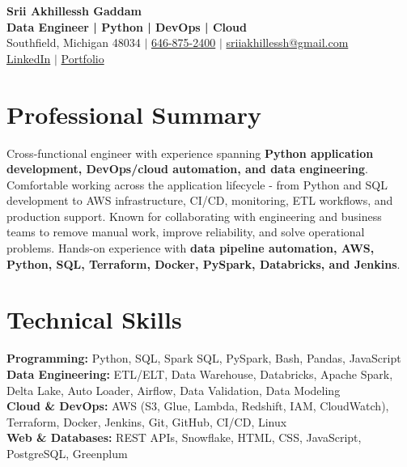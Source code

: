 \documentclass[letterpaper,10pt]{article}
\begin{document}
\fontsize{9.35pt}{10.45pt}\selectfont

\begin{center}
    {\LARGE \textbf{Srii Akhillessh Gaddam}} \\[-1pt]
    \textbf{Data Engineer | Python | DevOps | Cloud} \\[2pt]
    Southfield, Michigan 48034 $|$
    \href{tel:6468752400}{646-875-2400} $|$
    \href{mailto:sriiakhillessh@gmail.com}{sriiakhillessh@gmail.com} \\[1pt]
    \href{https://www.linkedin.com/in/srii-akhiilessh-gaddam-b48668191/}{LinkedIn} $|$
    \href{https://sriiakhillesshg.github.io/portfolio/}{Portfolio}
\end{center}
\vspace{-8pt}

\section{Professional Summary}
\small{Cross-functional engineer with experience spanning \textbf{Python application development, DevOps/cloud automation, and data engineering}. Comfortable working across the application lifecycle - from Python and SQL development to AWS infrastructure, CI/CD, monitoring, ETL workflows, and production support. Known for collaborating with engineering and business teams to remove manual work, improve reliability, and solve operational problems. Hands-on experience with \textbf{data pipeline automation, AWS, Python, SQL, Terraform, Docker, PySpark, Databricks, and Jenkins}.}

\section{Technical Skills}
\small{
\textbf{Programming:} Python, SQL, Spark SQL, PySpark, Bash, Pandas, JavaScript \\
\textbf{Data Engineering:} ETL/ELT, Data Warehouse, Databricks, Apache Spark, Delta Lake, Auto Loader, Airflow, Data Validation, Data Modeling \\
\textbf{Cloud \& DevOps:} AWS (S3, Glue, Lambda, Redshift, IAM, CloudWatch), Terraform, Docker, Jenkins, Git, GitHub, CI/CD, Linux \\
\textbf{Web \& Databases:} REST APIs, Snowflake, HTML, CSS, JavaScript, PostgreSQL, Greenplum
}
\end{document}
